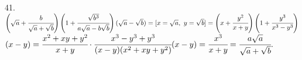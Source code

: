 41. $\left(\sqrt{a}+\cfrac{b}{\sqrt{a}+\sqrt{b}}\right)\left(1+\cfrac{\sqrt{b^3}}{a\sqrt{a}-b\sqrt{b}}\right)
(\sqrt{a}-\sqrt{b})=[x=\sqrt{a},\ y=\sqrt{b}]=\left(x+\cfrac{y^2}{x+y}\right)\left(1+\cfrac{y^3}{x^3-y^3}\right)$\\$
(x-y)=\cfrac{x^2+xy+y^2}{x+y}\cdot\cfrac{x^3-y^3+y^3}{(x-y)(x^2+xy+y^2)}(x-y)=\cfrac{x^3}{x+y}=\cfrac{a\sqrt{a}}{\sqrt{a}+\sqrt{b}}.$\\
